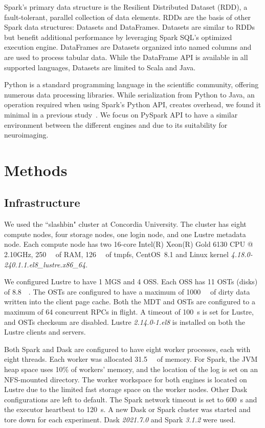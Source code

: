 \documentclass[conference]{IEEEtran}
\begin{document}
Spark's primary data structure is the Resilient Distributed Dataset (RDD)\cite{RDD}, a fault-tolerant, parallel collection of data elements.
RDDs are the basis of other Spark data structures: Datasets and DataFrames.
Datasets are similar to RDDs but benefit additional performance by leveraging Spark SQL's optimized execution engine. 
DataFrames are Datasets organized into named columns and are used to process tabular data. 
While the DataFrame API is available in all supported languages, Datasets are limited to Scala and Java. 

Python is a standard programming language in the scientific community, offering numerous data processing libraries.
While serialization from Python to Java, an operation required when using Spark's Python API, creates overhead, we found it minimal in a previous study~\cite{8943502}.
We focus on PySpark API to have a similar environment between the different engines and due to its suitability for neuroimaging.

\section{Methods}
\subsection{Infrastructure}
We used the ``slashbin" cluster at Concordia University.
The cluster has eight compute nodes, four storage nodes, one login node, and one Lustre metadata node.
Each compute node has two 16-core Intel(R) Xeon(R) Gold 6130 CPU @ 2.10GHz,
\SI{250}{\gibi\byte} of RAM, \SI{126}{\gibi\byte} of tmpfs,
CentOS~8.1 and Linux kernel \textit{4.18.0-240.1.1.el8\_lustre.x86\_64}.

We configured Lustre to have 1 MGS and 4 OSS.
Each OSS has 11 OSTs (disks) of \SI{8.8}{\tebi\byte}.
The OSTs are configured to have a maximum of \SI{1000}{\mebi\byte} of dirty data written into the client page cache.
Both the MDT and OSTs are configured to a maximum of 64 concurrent RPCs in flight.
A timeout of \SI{100}{\second} is set for Lustre, and OSTs checksum are disabled.
Lustre \textit{2.14.0-1.el8} is installed on both the Lustre clients and servers.
	
Both Spark and Dask are configured to have eight worker processes, each with eight threads.
Each worker was allocated \SI{31.5}{\gibi\byte} of memory.
For Spark, the JVM heap space uses 10\% of workers' memory, and the location of the log is set on an NFS-mounted directory.
The worker workspace for both engines is located on Lustre due to the limited fast storage space on the worker nodes.
Other Dask configurations are left to default.
The Spark network timeout is set to \SI{600}{\second} and the executor heartbeat to \SI{120}{\second}.
A new Dask or Spark cluster was started and tore down for each experiment.
Dask \textit{2021.7.0} and Spark \textit{3.1.2} were used.
	
\end{document}
